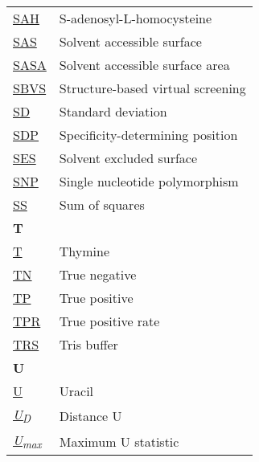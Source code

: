 \begin{longtable}[l]{@{}p{2.5cm}p{12cm}@{}}
\textmd{\href{https://www.ebi.ac.uk/pdbe-srv/pdbechem/chemicalCompound/show/SAH}{SAH}} & S-adenosyl-L-homocysteine \\
\textmd{\href{https://en.wikipedia.org/wiki/Accessible_surface_area}{SAS}} & Solvent accessible surface \\
\textmd{\href{https://en.wikipedia.org/wiki/Accessible_surface_area}{SASA}} & Solvent accessible surface area \\
\textmd{\href{https://en.wikipedia.org/wiki/Virtual_screening\#Structure-based_methods_known_protein_ligand_docking}{SBVS}} & Structure-based virtual screening \\
\textmd{\href{https://en.wikipedia.org/wiki/Standard_deviation}{SD}} & Standard deviation \\
\textmd{\href{https://www.nature.com/articles/s42003-024-06117-5}{SDP}} & Specificity-determining position \\
\textmd{\href{https://en.wikipedia.org/wiki/Accessible_surface_area\#Relation_to_solvent-excluded_surface}{SES}} & Solvent excluded surface \\
\textmd{\href{https://en.wikipedia.org/wiki/Single-nucleotide_polymorphism}{SNP}} & Single nucleotide polymorphism \\
\textmd{\href{https://en.wikipedia.org/wiki/Sum_of_squares}{SS}} & Sum of squares \\[0.3175cm]
\textbf{\large T} & \\[0.25cm]
\textmd{\href{https://en.wikipedia.org/wiki/Thymine}{T}} & Thymine \\
\textmd{\href{https://en.wikipedia.org/wiki/False_positives_and_false_negatives}{TN}} & True negative \\
\textmd{\href{https://en.wikipedia.org/wiki/False_positives_and_false_negatives}{TP}} & True positive \\
\textmd{\href{https://en.wikipedia.org/wiki/TPR}{TPR}} & True positive rate \\
\textmd{\href{https://www.ebi.ac.uk/pdbe-srv/pdbechem/chemicalCompound/show/TRS}{TRS}} & Tris buffer \\[0.3175cm]
\textbf{\large U} & \\[0.25cm]
\textmd{\href{https://en.wikipedia.org/wiki/Uracil}{U}} & Uracil \\
\textmd{\href{https://www.nature.com/articles/s42003-024-05970-8}{\textit{U\textsubscript{D}}}} & Distance U \\
\textmd{\href{https://www.nature.com/articles/s42003-024-05970-8}{\textit{U\textsubscript{max}}}} & Maximum U statistic \\

\end{longtable}
